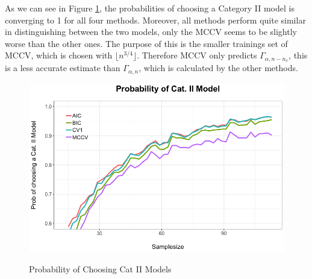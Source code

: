 \documentclass[Research_Module_ES.tex]{subfiles}
\begin{document}
As we can see in Figure \ref{Simulation1}, the probabilities of choosing a Category II model is converging to 1 for all four methods. Moreover, all methods perform quite similar in distinguishing between the two models, only the MCCV seems to be slightly worse than the other ones. The purpose of this is the smaller trainings set of MCCV, which is chosen with $\lfloor n^{3/4}\rfloor$. Therefore MCCV only predicts $\Gamma_{\alpha,n-n_v}$, this is a less accurate estimate than $\Gamma_{\alpha,n}$, which is calculated by the other methods. 
\begin{figure}[!h]
	\label{Simulation1}
	\centering
	\includegraphics[width=1\textwidth]{Simulation1.png}\\
\caption{Probability of Choosing Cat II Models}
\end{figure}
\end{document}
